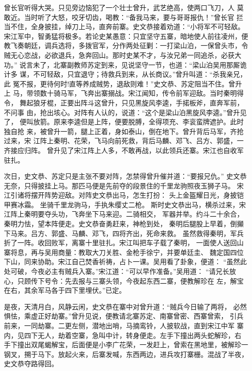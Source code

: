 曾长官听得大哭。只见旁边恼犯了一个壮士曾升，武艺绝高，使两口飞刀，人
莫敢近。当时听了大怒，咬牙切齿，喝教：“备我马来，要与哥哥报仇！”曾长官
拦当不住，全身披挂，绰刀上马，直奔前寨。史文恭接着劝道：“小将军不可轻敌。
宋江军中，智勇猛将极多。若论史某愚意：只宜坚守五寨，暗地使人前往凌州，便
教飞奏朝廷，调兵选将，多拨官军，分作两处征剿：一打梁山泊，一保曾头市，令
贼无心恋战，必欲退兵，急奔回山。那时史某不才，与汝兄弟一同追杀，必获大功。”
说言未了，北寨副教师苏定到来，见说坚守一节，也道：“梁山泊吴用那厮诡计多
谋，不可轻敌，只宜退守；待救兵到来，从长商议。”曾升叫道：“杀我亲兄，此
冤不报，更待何时!直等养成贼势，退敌则难！”史文恭、苏定阻当不住。曾升上
马，带领数十骑马军，飞奔出寨搦战。宋江闻知，传令前军迎敌。当时秦明得令，
舞起狼牙棍，正要出阵斗这曾升，只见黑旋风李逵，手掿板斧，直奔军前，不问事
由，抢出垓心。对阵有人认的，说道：“这个是梁山泊黑旋风李逵。”曾升见了，
便叫放箭。原来李逵但是上阵，便要脱膊，全得项充、李衮蛮牌遮护。此时独自抢
来，被曾升一箭，腿上正着，身如泰山，倒在地下。曾升背后马军，齐抢过来，宋
江阵上秦明、花荣，飞马向前死救，背后马麟、邓飞、吕方、郭盛，一齐接应归阵。
曾升见了宋江阵上人多，不敢再战，以此领兵还寨。宋江也自收军驻扎。

次日，史文恭、苏定只是主张不要对阵，怎禁得曾升催并道：“要报兄仇。”
史文恭无奈，只得披挂上马。那匹马便是先前夺的段景住的千里龙驹照夜玉狮子马。
宋江引诸将摆开阵势迎敌。对阵史文恭出马，怎生打扮：
头上金盔耀日光，身披铠甲赛冰霜。
坐骑千里龙驹马，手执朱缨丈二枪。
斯时史文恭出马，横杀过来，宋江阵上秦明要夺头功，飞奔坐下马来迎。二骑相交，
军器并举。约斗二十余合，秦明力怯，望本阵便走。史文恭奋勇赶来，神枪到处，
秦明后腿股上早着，倒攧下马来。吕方、郭盛、马麟、邓飞，四将齐出，死命来救。
虽然救得秦明，军兵折了一阵。收回败军，离寨十里驻扎。宋江叫把车子载了秦明，
一面使人送回山寨将息，再与吴用商量：教取大刀关胜、金枪手徐宁，并要单廷圭、
魏定国四位下山，同来协助。宋江自己焚香祈祷，占卜一课。吴用看了卦象，便道：
“虽然此处可破，今夜必主有贼兵入寨。”宋江道：“可以早作准备。”吴用道：
“请兄长放心，只顾传下号令：先去报与三寨头领，今夜起东西二寨，便教解珍在
左，解宝在右，其余军马各于四下里埋伏。”已定。

是夜，天清月白，风静云闲，史文恭在寨中对曾升道：“贼兵今日输了两将，
必然惧怯，乘虚正好劫寨。”曾升见说，便教请北寨苏定、南寨曾密、西寨曾索，
引兵前来，一同劫寨。二更左侧，潜地出哨，马摘鸾铃，人披软战，直到宋江中军
寨内，见四下无人，劫着空寨，急叫中计，转身便走。左手下撞出两头蛇解珍，右
手下撞出双尾蝎解宝，后面便是小李广花荣，一发赶上，曾索在黑地里，被解珍一
钢叉，搠于马下。放起火来，后寨发喊，东西两边，进兵攻打寨栅。混战了半夜，
史文恭夺路得回。

